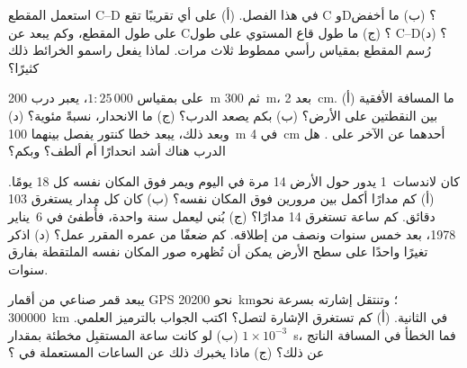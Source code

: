 \begin{exercise}[$\star\star$]\label{exo:g9:maps-of-the-earth:7}
استعمل المقطع C--D في هذا الفصل. (أ) على أي  تقريبًا تقع C وD؟
(ب) ما أخفض  على طول المقطع، وكم يبعد عن C؟ (ج) ما طول قاع 
المستوي على طول C--D؟ (د) رُسم المقطع بمقياس رأسي ممطوط ثلاث مرات. لماذا
يفعل راسمو الخرائط ذلك
كثيرًا؟
\end{exercise}

\begin{exercise}[$\star\star$]\label{exo:g9:maps-of-the-earth:8}
على  بمقياس $1 : 25\,000$، يعبر درب  \qty{200}{m} ثم  \qty{300}{m}، بعد \qty{2}{cm}. (أ) ما المسافة الأفقية بين
النقطتين على الأرض؟ (ب) بكم يصعد الدرب؟ (ج) ما الانحدار، نسبةً مئوية؟
(د) وبعد ذلك، يبعد خطا كنتور يفصل بينهما \qty{100}{m} في 
\qty{4}{cm} أحدهما عن الآخر على . هل الدرب هناك أشد انحدارًا أم
ألطف؟ وبكم؟
\end{exercise}

\begin{exercise}[$\star\star$]\label{exo:g9:maps-of-the-earth:9}
كان لاندسات~1 يدور حول الأرض 14 مرة في اليوم ويمر فوق المكان نفسه كل 18
يومًا. (أ) كم مدارًا أكمل بين مرورين فوق المكان نفسه؟ (ب) كان كل مدار
يستغرق 103 دقائق. كم ساعة تستغرق 14 مدارًا؟ (ج) بُني ليعمل سنة واحدة،
فأُطفئ في 6~يناير 1978، بعد خمس سنوات ونصف من إطلاقه. كم ضعفًا من عمره
المقرر عمل؟ (د) اذكر تغيرًا واحدًا على سطح الأرض يمكن أن تُظهره صور المكان
نفسه الملتقطة بفارق
سنوات.
\end{exercise}

\begin{exercise}[$\star\star$]\label{exo:g9:maps-of-the-earth:10}
يبعد قمر صناعي من أقمار GPS نحو \qty{20200}{km}؛ وتنتقل إشارته بسرعة نحو
\qty{300000}{km} في الثانية. (أ) كم تستغرق الإشارة لتصل؟ اكتب الجواب
بالترميز العلمي. (ب) لو كانت ساعة المستقبِل مخطئة بمقدار
$1 \times 10^{-3}$~s، فما الخطأ في المسافة الناتج عن ذلك؟ (ج) ماذا يخبرك
ذلك عن الساعات المستعملة في ؟
\end{exercise}

